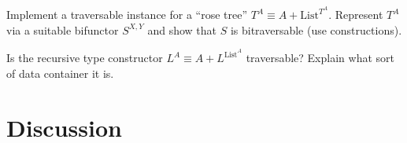 {\footnotesize{}Implement a traversable instance for a ``rose tree''
$T^{A}\equiv A+\text{List}^{T^{A}}$. Represent $T^{A}$ via a suitable
bifunctor $S^{X,Y}$ and show that $S$ is bitraversable (use constructions).}{\footnotesize\par}

{\footnotesize{}Is the recursive type constructor $L^{A}\equiv A+L^{\text{List}^{A}}$
traversable? Explain what sort of data container it is.}{\footnotesize\par}

\section{Discussion}

\begin{comment}
this is chapter 9 of the functional programming tutorial traversable
functors to motivate the interrupted introduction of these factors
into practice I always remember the example that you have a list of
some data items and you want to process it by using a function like
this where you have a future as a as a result of this function and
the usual way of doing this in Scala is to use a function called future
dot sequence and I have seen this I have shown this in a previous
tutorial and the idea is that you want to process each element of
this list with this function and you have to wait until the entire
list is done so we have many separate computations for each element
of the list encapsulated by the future for each one of them you want
to wait until the entire list is done and basically this is the type
signature that you want in order to implement this computation you
have a list of a you have a function from a to future B and you want
to get a list of B as a result and you can get it in the future so
you have a future of lists of it as a result and that is the type
signature that the function future that sequence will allow you to
have with some work but in order to understand what this kind of computation
does we want to generalize from the future to an arbitrary type constructor
F and we want to understand what properties these type constructors
must answer so the list we have L and instead the future we have F
and the type signature of the function is like this so this function
is called Traverse I believe there's also a future of traders with
a type signature like this that works on sequences we want to generalize
to some type constructors F and L and that's what we will be able
to do once we understand the properties of this operation so this

\end{comment}
